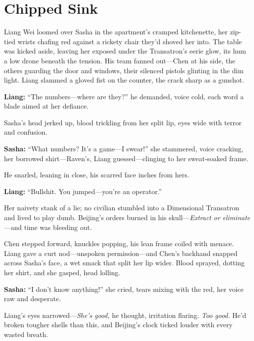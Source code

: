 \documentclass[12pt]{book}
\begin{document}
\vspace{1em}

\section{Chipped Sink}

Liang Wei loomed over Sasha in the apartment’s cramped kitchenette, her zip-tied wrists chafing red against a rickety chair they’d shoved her into. The table was kicked aside, leaving her exposed under the Transatron’s eerie glow, its hum a low drone beneath the tension. His team fanned out—Chen at his side, the others guarding the door and windows, their silenced pistols glinting in the dim light. Liang slammed a gloved fist on the counter, the crack sharp as a gunshot. 

\vspace{0.5em}
\textbf{Liang:} “The numbers—where are they?” he demanded, voice cold, each word a blade aimed at her defiance.

Sasha’s head jerked up, blood trickling from her split lip, eyes wide with terror and confusion. 

\vspace{0.5em}
\textbf{Sasha:} “What numbers? It’s a game—I swear!” she stammered, voice cracking, her borrowed shirt—Raven’s, Liang guessed—clinging to her sweat-soaked frame.

He snarled, leaning in close, his scarred face inches from hers. 

\vspace{0.5em}
\textbf{Liang:} “Bullshit. You jumped—you’re an operator.”

Her naivety stank of a lie; no civilian stumbled into a Dimensional Transatron and lived to play dumb. Beijing’s orders burned in his skull—\emph{Extract or eliminate}—and time was bleeding out.

Chen stepped forward, knuckles popping, his lean frame coiled with menace. Liang gave a curt nod—unspoken permission—and Chen’s backhand snapped across Sasha’s face, a wet smack that split her lip wider. Blood sprayed, dotting her shirt, and she gasped, head lolling. 

\vspace{0.5em}
\textbf{Sasha:} “I don’t know anything!” she cried, tears mixing with the red, her voice raw and desperate.

Liang’s eyes narrowed—\emph{She’s good,} he thought, irritation flaring. \emph{Too good.} He’d broken tougher shells than this, and Beijing’s clock ticked louder with every wasted breath.
\end{document}
